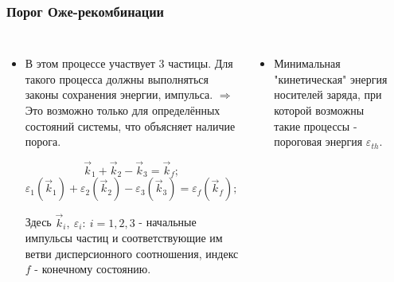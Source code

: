 \documentclass[9pt,pdf]{beamer}
\begin{document}
  \begin{frame}
    \frametitle{Порог Оже-рекомбинации}

    \begin{columns}
        \begin{itemize}
            \item В этом процессе участвует 3 частицы. 
              Для такого процесса должны выполняться законы 
              сохранения энергии, импульса. $\Rightarrow$ 
              Это возможно только для определённых 
              состояний системы, что объясняет наличие порога.

              \begin{equation*}
                \vec{k}_1 + \vec{k}_2 - \vec{k}_3 = \vec{k}_f;
              \end{equation*}
              \begin{equation*}
                \varepsilon_{1}(\vec{k}_{1}) + \varepsilon_{2}(\vec{k}_{2})
                 - \varepsilon_{3}(\vec{k}_{3}) = \varepsilon_{f}(\vec{k}_f);
              \end{equation*}

              Здесь $\vec{k}_i,~\varepsilon_i:~i=1,2,3$ - начальные 
        импульсы частиц и соответствующие им ветви дисперсионного 
        соотношения, индекс $f$ - конечному состоянию.
        \end{itemize}

        \begin{itemize}
          \item Минимальная "кинетическая" энергия носителей
              заряда, при которой возможны такие процессы - 
              пороговая энергия $\varepsilon_{th}$.
        \end{itemize}
          \begin{overprint}
            \begin{center}


\end{center}
\end{overprint}
\end{columns}
\end{frame}
\end{document}
